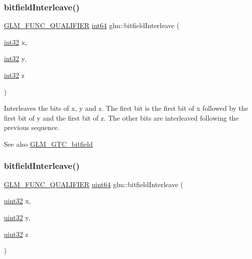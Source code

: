 \subsubsection{\texorpdfstring{bitfield\+Interleave()}{bitfieldInterleave()}\hspace{0.1cm}{\footnotesize\ttfamily [11/16]}}
{\footnotesize\ttfamily \mbox{\hyperlink{setup_8hpp_a33fdea6f91c5f834105f7415e2a64407}{G\+L\+M\+\_\+\+F\+U\+N\+C\+\_\+\+Q\+U\+A\+L\+I\+F\+I\+ER}} \mbox{\hyperlink{group__gtc__type__precision_ga435d75819cce297cc5fa21bd84ef89a5}{int64}} glm\+::bitfield\+Interleave (\begin{DoxyParamCaption}\item[{\mbox{\hyperlink{group__gtc__type__precision_ga632d8b25f6b61659f39ea4321fab92a4}{int32}}}]{x,  }\item[{\mbox{\hyperlink{group__gtc__type__precision_ga632d8b25f6b61659f39ea4321fab92a4}{int32}}}]{y,  }\item[{\mbox{\hyperlink{group__gtc__type__precision_ga632d8b25f6b61659f39ea4321fab92a4}{int32}}}]{z }\end{DoxyParamCaption})}

Interleaves the bits of x, y and z. The first bit is the first bit of x followed by the first bit of y and the first bit of z. The other bits are interleaved following the previous sequence.

\begin{DoxySeeAlso}{See also}
\mbox{\hyperlink{group__gtc__bitfield}{G\+L\+M\+\_\+\+G\+T\+C\+\_\+bitfield}} 
\end{DoxySeeAlso}
\mbox{\label{group__gtc__bitfield_ga7c10eb37f608365cfaef5ca2c476e1ce}} 
\subsubsection{\texorpdfstring{bitfield\+Interleave()}{bitfieldInterleave()}\hspace{0.1cm}{\footnotesize\ttfamily [12/16]}}
{\footnotesize\ttfamily \mbox{\hyperlink{setup_8hpp_a33fdea6f91c5f834105f7415e2a64407}{G\+L\+M\+\_\+\+F\+U\+N\+C\+\_\+\+Q\+U\+A\+L\+I\+F\+I\+ER}} \mbox{\hyperlink{group__gtc__type__precision_gae3632bf9b37da66233d78930dd06378a}{uint64}} glm\+::bitfield\+Interleave (\begin{DoxyParamCaption}\item[{\mbox{\hyperlink{group__gtc__type__precision_ga202b6a53c105fcb7e531f9b443518451}{uint32}}}]{x,  }\item[{\mbox{\hyperlink{group__gtc__type__precision_ga202b6a53c105fcb7e531f9b443518451}{uint32}}}]{y,  }\item[{\mbox{\hyperlink{group__gtc__type__precision_ga202b6a53c105fcb7e531f9b443518451}{uint32}}}]{z }\end{DoxyParamCaption})}

